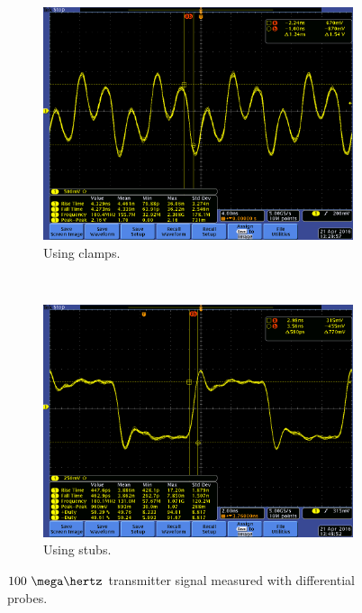 \documentclass[main.tex]{subfiles}
\begin{document}
\begin{figure}
    \centering
    \begin{subfigure}{0.5\textwidth}
        \centering
        \includegraphics[width=\linewidth]{../img/hektere_oppsett_100mhz.png}
        \caption{Using clamps.}
    \end{subfigure}%
    ~~
    \begin{subfigure}{0.5\textwidth}
        \centering
        \includegraphics[width=\linewidth]{../img/stubs_oppsett_100mhz.png}
        \caption{Using stubs.}
    \end{subfigure}
    \caption{$100~\mega\hertz$ transmitter signal measured with differential probes.}
    \label{fig:measdiff}
\end{figure}
\end{document}
